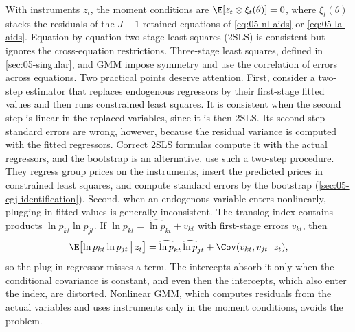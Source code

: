 With instruments $z_t$, the moment conditions are $\E[z_t\otimes\xi_t(\theta)] = 0$, where
$\xi_t(\theta)$ stacks the residuals of the $J - 1$ retained equations of \eqref{eq:05-nl-aids} or
\eqref{eq:05-la-aids}. Equation-by-equation two-stage least squares (2SLS) is consistent but ignores the
cross-equation restrictions. Three-stage least squares, defined in \cref{sec:05-singular}, and GMM impose
symmetry and use the correlation of errors across equations. Two practical points deserve attention. First, consider a two-step estimator that replaces endogenous regressors by their first-stage
fitted values and then runs constrained least squares. It is consistent when the second step is linear in
the replaced variables, since it is then 2SLS. Its second-step standard errors are wrong, however, because
the residual variance is computed with the fitted regressors. Correct 2SLS formulas compute it with the
actual regressors, and the bootstrap is an alternative. \citet[p.~20]{ChaudhuriGoldbergJia2006} use such a two-step procedure. They regress
group prices on the instruments, insert the predicted prices in constrained least squares, and compute
standard errors by the bootstrap (\cref{sec:05-cgj-identification}). Second, when an endogenous variable
enters nonlinearly, plugging in fitted values is
generally inconsistent. The translog index contains products $\ln p_{kt}\ln p_{jt}$. If $\ln p_{kt} =
\widehat{\ln p}_{kt} + v_{kt}$ with first-stage errors $v_{kt}$, then
\begin{equation*}
  \E\bigl[\ln p_{kt}\ln p_{jt}\,\big|\, z_t\bigr] = \widehat{\ln p}_{kt}\,\widehat{\ln p}_{jt}
  + \Cov(v_{kt}, v_{jt}\,|\, z_t),
\end{equation*}
so the plug-in regressor misses a term. The intercepts absorb it only when the conditional covariance is
constant, and even then the intercepts, which also enter the index, are distorted. Nonlinear GMM, which
computes residuals from the actual variables and uses instruments only in the moment conditions, avoids
the problem.

